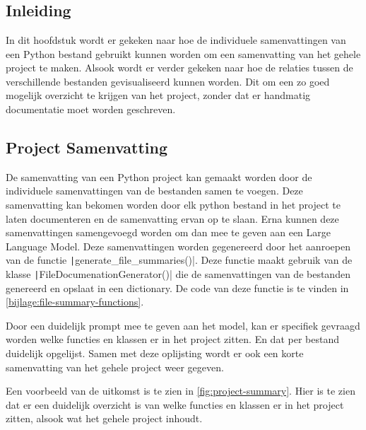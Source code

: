 
\chapter{}
\label{ch:project-documentatie}

\section{Inleiding}
\label{sec:project-documentatie-inleiding}

In dit hoofdstuk wordt er gekeken naar hoe de individuele samenvattingen van een Python bestand gebruikt kunnen worden om een samenvatting van het gehele project te maken.
Alsook wordt er verder gekeken naar hoe de relaties tussen de verschillende bestanden gevisualiseerd kunnen worden.
Dit om een zo goed mogelijk overzicht te krijgen van het project, zonder dat er handmatig documentatie moet worden geschreven.

\section{Project Samenvatting}
\label{sec:project-documentatie-samenvatting}

De samenvatting van een Python project kan gemaakt worden door de individuele samenvattingen van de bestanden samen te voegen.
Deze samenvatting kan bekomen worden door elk python bestand in het project te laten documenteren en de samenvatting ervan op te slaan.
Erna kunnen deze samenvattingen samengevoegd worden om dan mee te geven aan een Large Language Model.
Deze samenvattingen worden gegenereerd door het aanroepen van de functie \texttt|generate_file_summaries()|. 
Deze functie maakt gebruik van de klasse \texttt|FileDocumenationGenerator()| die de samenvattingen van de bestanden genereerd en opslaat in een dictionary.
De code van deze functie is te vinden in \ref{bijlage:file-summary-functions}.  

Door een duidelijk prompt mee te geven aan het model, kan er specifiek gevraagd worden welke functies en klassen er in het project zitten.
En dat per bestand duidelijk opgelijst. Samen met deze oplijsting wordt er ook een korte samenvatting van het gehele project weer gegeven.

Een voorbeeld van de uitkomst is te zien in \ref{fig:project-summary}.
Hier is te zien dat er een duidelijk overzicht is van welke functies en klassen er in het project zitten, alsook wat het gehele project inhoudt.

